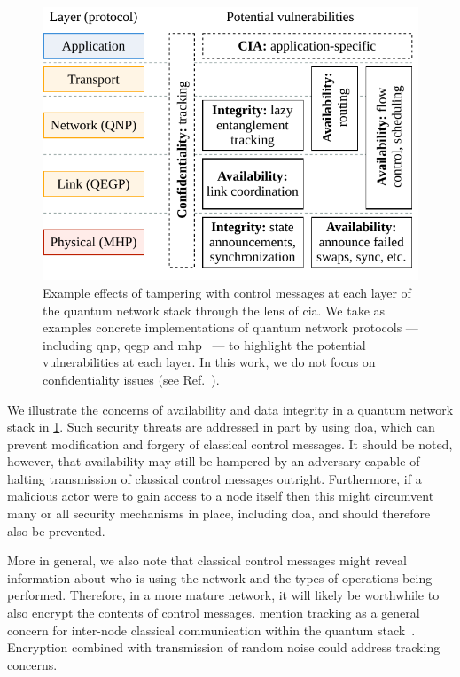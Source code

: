 \begin{figure}[t]
    \centering
    \includegraphics[width=0.6\linewidth]{figures/doa-examples.pdf}
    \caption{
        Example effects of tampering with control messages at each layer of the quantum network
        stack through the lens of \acrfull{cia}. We take as examples concrete implementations of
        quantum network protocols --- including \acrshort{qnp}, \acrshort{qegp} and
        \acrshort{mhp}~\cite{kozlowski_2020_qnp, dahlberg_2019_egp} --- to highlight the potential
        vulnerabilities at each layer. In this work, we do not focus on confidentiality issues (see
        Ref.~\cite{satoh_2020_attacking}).
    }
    \label{fig:doa-examples}
\end{figure}

We illustrate the concerns of availability and data integrity in a quantum network stack in
\cref{fig:doa-examples}. Such security threats are addressed in part by using \acrlong{doa}, which
can prevent modification and forgery of classical control messages. It should be noted, however,
that availability may still be hampered by an adversary capable of halting transmission of classical
control messages outright. Furthermore, if a malicious actor were to gain access to a node itself
then this might circumvent many or all security mechanisms in place, including \acrshort{doa}, and
should therefore also be prevented.

More in general, we also note that classical control messages might reveal information about who is
using the network and the types of operations being performed. Therefore, in a more mature network,
it will likely be worthwhile to also encrypt the contents of control messages.
\citeauthor{satoh_2020_attacking} mention tracking as a general concern for inter-node classical
communication within the quantum stack~\cite{satoh_2020_attacking}. Encryption combined with
transmission of random noise could address tracking concerns.

